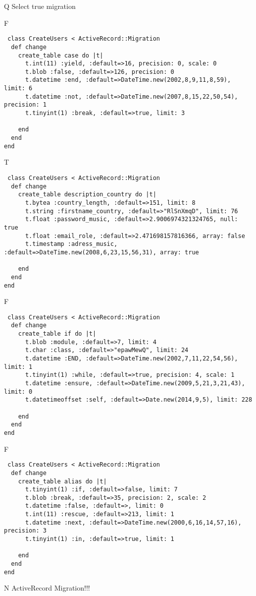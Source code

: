 Q
Select true migration

F
\begin{verbatim}
 class CreateUsers < ActiveRecord::Migration 
  def change 
    create_table case do |t| 
      t.int(11) :yield, :default=>16, precision: 0, scale: 0
      t.blob :false, :default=>126, precision: 0
      t.datetime :end, :default=>DateTime.new(2002,8,9,11,8,59), limit: 6
      t.datetime :not, :default=>DateTime.new(2007,8,15,22,50,54), precision: 1
      t.tinyint(1) :break, :default=>true, limit: 3
   
    end 
  end 
end
\end{verbatim}

T
\begin{verbatim}
 class CreateUsers < ActiveRecord::Migration 
  def change 
    create_table description_country do |t| 
      t.bytea :country_length, :default=>151, limit: 8
      t.string :firstname_country, :default=>"RlSnXmqD", limit: 76
      t.float :password_music, :default=>2.9006974321324765, null: true
      t.float :email_role, :default=>2.471698157816366, array: false
      t.timestamp :adress_music, :default=>DateTime.new(2008,6,23,15,56,31), array: true
   
    end 
  end 
end
\end{verbatim}

F
\begin{verbatim}
 class CreateUsers < ActiveRecord::Migration 
  def change 
    create_table if do |t| 
      t.blob :module, :default=>7, limit: 4
      t.char :class, :default=>"epawMewQ", limit: 24
      t.datetime :END, :default=>DateTime.new(2002,7,11,22,54,56), limit: 1
      t.tinyint(1) :while, :default=>true, precision: 4, scale: 1
      t.datetime :ensure, :default=>DateTime.new(2009,5,21,3,21,43), limit: 0
      t.datetimeoffset :self, :default=>Date.new(2014,9,5), limit: 228
   
    end 
  end 
end
\end{verbatim}

F
\begin{verbatim}
 class CreateUsers < ActiveRecord::Migration 
  def change 
    create_table alias do |t| 
      t.tinyint(1) :if, :default=>false, limit: 7
      t.blob :break, :default=>35, precision: 2, scale: 2
      t.datetime :false, :default=>, limit: 0
      t.int(11) :rescue, :default=>213, limit: 1
      t.datetime :next, :default=>DateTime.new(2000,6,16,14,57,16), precision: 3
      t.tinyint(1) :in, :default=>true, limit: 1
   
    end 
  end 
end
\end{verbatim}
N
ActiveRecord Migration!!!
  
